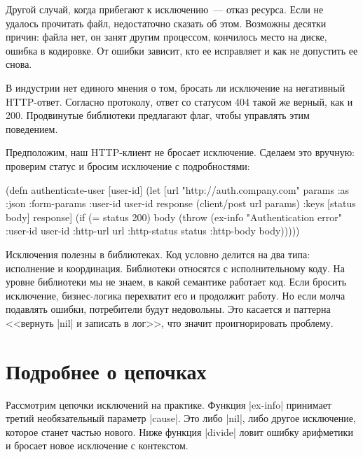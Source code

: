Другой случай, когда прибегают к исключению~--- отказ ресурса. Если не удалось
прочитать файл, недостаточно сказать об этом. Возможны десятки причин: файла
нет, он занят другим процессом, кончилось место на диске, ошибка в кодировке. От
ошибки зависит, кто ее исправляет и как не допустить ее снова.

В индустрии нет единого мнения о том, бросать ли исключение на негативный
HTTP-ответ. Согласно протоколу, ответ со статусом 404 такой же верный, как и
200. Продвинутые библиотеки предлагают флаг, чтобы управлять этим поведением.

Предположим, наш HTTP-клиент не бросает исключение. Сделаем это вручную:
проверим статус и бросим исключение с подробностями:

\begin{english}
  \begin{clojure}
(defn authenticate-user [user-id]
  (let [url "http://auth.company.com"
        params {:as :json :form-params {:user-id user-id}}
        response (client/post url params)
        {:keys [status body]} response]
    (if (= status 200)
      body
      (throw (ex-info "Authentication error"
                      {:user-id user-id
                       :http-url url
                       :http-status status
                       :http-body body})))))
  \end{clojure}
\end{english}

Исключения полезны в библиотеках. Код условно делится на два типа: исполнение и
координация. Библиотеки относятся с исполнительному коду. На уровне библиотеки
мы не знаем, в какой семантике работает код. Если бросить исключение,
бизнес-логика перехватит его и продолжит работу. Но если молча подавлять ошибки,
потребители будут недовольны. Это касается и паттерна <<вернуть \spverb|nil| и
записать в лог>>, что значит проигнорировать проблему.

\section{Подробнее о цепочках}

Рассмотрим цепочки исключений на практике. Функция \spverb|ex-info|
принимает третий необязательный параметр \spverb|cause|. Это либо \spverb|nil|,
либо другое исключение, которое станет частью нового. Ниже функция
\spverb|divide| ловит ошибку арифметики и бросает новое исключение с контекстом.

\label{re-throw-example}

